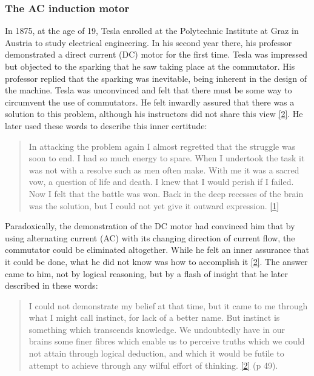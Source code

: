 \documentclass[
  12pt,
  british,
  a4paper,
  rgb,
  dvipsnames,
  svgnames,
  hyphens]{article}
\begin{document}
\hypertarget{the-ac-induction-motor}{%
\subsubsection{The AC induction motor}\label{the-ac-induction-motor}}

In 1875, at the age of 19, Tesla enrolled at the Polytechnic Institute
at Graz in Austria to study electrical engineering. In his second year
there, his professor demonstrated a direct current (DC) motor for the
first time. Tesla was impressed but objected to the sparking that he saw
taking place at the commutator. His professor replied that the sparking
was inevitable, being inherent in the design of the machine. Tesla was
unconvinced and felt that there must be some way to circumvent the use
of commutators. He felt inwardly assured that there was a solution to
this problem, although his instructors did not share this view
\protect\hyperlink{ref-oneill80}{{[}2{]}}. He later used these words to
describe this inner certitude:

\begin{quote}
In attacking the problem again I almost regretted that the struggle was
soon to end. I had so much energy to spare. When I undertook the task it
was not with a resolve such as men often make. With me it was a sacred
vow, a question of life and death. I knew that I would perish if I
failed. Now I felt that the battle was won. Back in the deep recesses of
the brain was the solution, but I could not yet give it outward
expression. \protect\hyperlink{ref-john83}{{[}1{]}}
\end{quote}

Paradoxically, the demonstration of the DC motor had convinced him that
by using alternating current (AC) with its changing direction of current
flow, the commutator could be eliminated altogether. While he felt an
inner assurance that it could be done, what he did not know was how to
accomplish it \protect\hyperlink{ref-oneill80}{{[}2{]}}. The answer came
to him, not by logical reasoning, but by a flash of insight that he
later described in these words:

\begin{quote}
I could not demonstrate my belief at that time, but it came to me
through what I might call instinct, for lack of a better name. But
instinct is something which transcends knowledge. We undoubtedly have in
our brains some finer fibres which enable us to perceive truths which we
could not attain through logical deduction, and which it would be futile
to attempt to achieve through any wilful effort of thinking.
\protect\hyperlink{ref-oneill80}{{[}2{]}} (p 49).
\end{quote}
\end{document}
